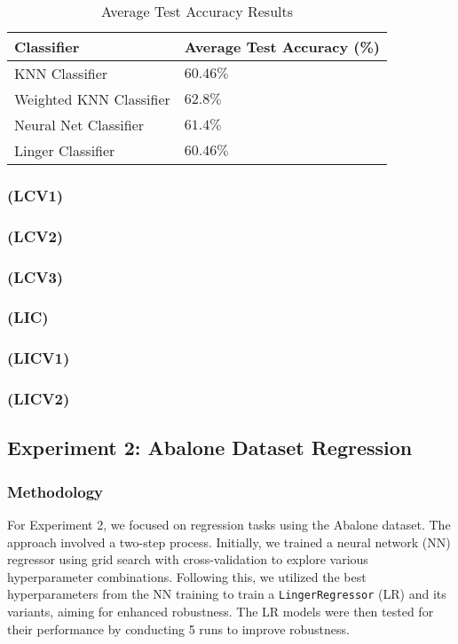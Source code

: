 \documentclass[a4paper, 12pt]{report}
\begin{document}
\begin{table}[H]
    \centering
    \caption{Average Test Accuracy Results}
    \label{tab:average_results_test_Glass}
    \begin{tabular}{|l|l|}
    \hline
    \textbf{Classifier} & \textbf{Average Test Accuracy (\%)} \\ \hline
    KNN Classifier & $60.46\%$ \\ \hline
    Weighted KNN Classifier & $62.8\%$ \\ \hline
    Neural Net Classifier & $61.4\%$ \\ \hline
    Linger Classifier & $60.46\%$ \\ \hline
    \end{tabular}
\end{table}

\subsubsection{(LCV1)}
\subsubsection{(LCV2)}
\subsubsection{(LCV3)}
\subsubsection{(LIC)}
\subsubsection{(LICV1)}
\subsubsection{(LICV2)}

\subsection{Experiment 2: Abalone Dataset Regression}
\subsubsection{Methodology}
For Experiment 2, we focused on regression tasks using the Abalone dataset. 
The approach involved a two-step process. Initially, we trained a neural network (NN) regressor using grid search with 
cross-validation to explore various hyperparameter combinations. Following this, we utilized the best hyperparameters from the NN training 
to train a \texttt{LingerRegressor} (LR) and its variants, aiming for enhanced robustness. 
The LR models were then tested for their performance by conducting 5 runs to improve robustness.
\end{document}
